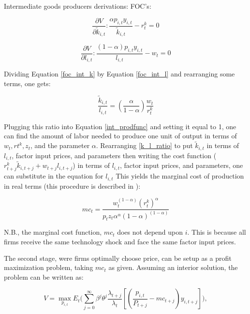 Intermediate goods producers derivations:
FOC's:

\begin{equation}
\label{foc_int_k}
\frac{\partial V}{\partial \tilde{k}_{i,t}}:\frac{\alpha p_{i,t}y_{i,t}}{\tilde{k}_{i,t}}-r_{t}^{k}=0
\end{equation}

\begin{equation}
\label{foc_int_l}
\frac{\partial V}{\partial l_{i,t}}:\frac{(1-\alpha) p_{i,t}y_{i,t}}{l_{i,t}}-w_{t}=0
\end{equation}

Dividing Equation \ref{foc_int_k} by Equation \ref{foc_int_l} and rearranging some terms, one gets:

\begin{equation}
\label{k_l_ratio}
\frac{\tilde{k}_{i,t}}{l_{i,t}}=\left(\frac{\alpha}{1-\alpha}\right)\frac{w_{t}}{r_{t}^{k}}
\end{equation}


Plugging this ratio into Equation \ref{int_prodfunc} and setting it equal to 1, one can find the amount of labor needed to produce one unit of output in terms of $w_{t}, r{t}^{k}, z_{t}$, and the parameter $\alpha$.  Rearranging \ref{k_l_ratio} to put $\tilde{k}_{i,t}$ in terms of $l_{i,t}$, factor input prices, and parameters then writing the cost function ($r_{t+j}^{k}\tilde{k}_{i,t+j}+w_{t+j}l_{i,t+j}$) in terms of $l_{i,t}$, factor input prices, and parameters, one can substitute in the equation for $l_{i,t}$ This yields the marginal cost of production in real terms (this procedure is described in ):

\begin{equation}
mc_{t}=\frac{w_{t}^{(1-\alpha)}(r_{t}^{k})^{\alpha}}{p_{t}z_{t}\alpha^{\alpha}(1-\alpha)^{(1-\alpha)}}
\end{equation}

\noindent\noindent N.B., the marginal cost function, $mc_{t}$ does not depend upon $i$.  This is because all firms receive the same technology shock and face the same factor input prices.

The second stage, were firms optimally choose price, can be setup as a profit maximization problem, taking $mc_{t}$ as given.  Assuming an interior solution, the problem can be written as:

\begin{equation}
V=\max_{p_{i,t}}E_{t}\Biggl(\sum_{j=0}^{\infty}\beta^{j}\theta^{j}\frac{\lambda_{t+j}}{\lambda_{t}}\left[\left(\frac{p_{i,t}}{P_{t+j}}-mc_{t+j}\right)y_{i,t+j}\right]\Biggr),
\end{equation}

